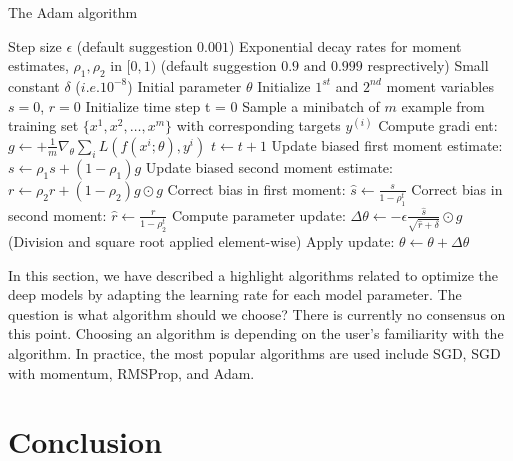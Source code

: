 \begin{algorithm}
	\caption{The Adam algorithm}
	\label{Adam_algorithm}
	\begin{algorithmic}
		\REQUIRE Step size $\epsilon$ (default suggestion $0.001$)
		\REQUIRE Exponential decay rates for moment estimates, $\rho_1, \rho_2$ in $[0, 1)$ (default suggestion $0.9 \text{ and } 0.999$ resprectively)
		\REQUIRE Small constant $\delta$ ($i.e. 10^{-8}$)
		\REQUIRE Initial parameter $\theta$
		\STATE Initialize $1^{st}$ and $2^{nd}$ moment variables $s = 0$, $r = 0$
		\STATE Initialize time step t = 0
			\STATE Sample a minibatch of $m$ example from training set $\{ x^1,x^2,\ldots, x^m \}$ with corresponding targets $y^{(i)}$
			\STATE Compute gradi ent: $g \leftarrow + \frac{1}{m} \nabla_{\theta} \sum_i L(f(x^i;\theta), y^i) $
			\STATE $t \leftarrow t + 1$
			\STATE Update biased first moment estimate: $s \leftarrow \rho_1 s + (1 - \rho_1)g$
			\STATE Update biased second moment estimate: $r \leftarrow \rho_2 r + (1 - \rho_2)g \odot g $
			\STATE Correct bias in first moment: $\hat{s} \leftarrow \frac{s}{1-\rho_1^t}$
			\STATE Correct bias in second moment: $\hat{r} \leftarrow \frac{r}{1 - \rho_2^t}$
			\STATE Compute parameter update: $\Delta \theta \leftarrow - \epsilon \frac{\hat{s}}{\sqrt{\hat{r} + \delta}} \odot g$ (Division and square root applied element-wise)
			\STATE Apply update: $\theta \leftarrow \theta + \Delta \theta$
		\ENDWHILE
	\end{algorithmic}
\end{algorithm}

In this section, we have described a highlight algorithms related to optimize the deep models by adapting the learning rate for each model parameter. The question is what algorithm should we choose? There is currently no consensus on this point. Choosing an algorithm is depending on the user's familiarity with the algorithm. In practice, the most popular algorithms are used include  SGD, SGD with momentum, RMSProp, and Adam.

\section{Conclusion}
